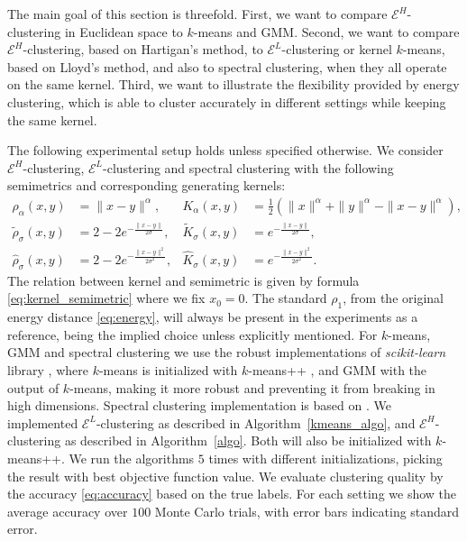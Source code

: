 \documentclass[aps,preprint,nofootinbib,floatfix]{revtex4-1}
\newcommand\kk{K}
\begin{document}
The main goal of this section is threefold. First, we want to compare
$\mathcal{E}^H$-clustering in Euclidean space to 
$k$-means and GMM. Second, we want
to compare $\mathcal{E}^H$-clustering, based on Hartigan's method, to
$\mathcal{E}^L$-clustering or kernel $k$-means, based on Lloyd's method,
and also to 
spectral clustering, when they all operate on the same kernel.
Third, we want to illustrate the flexibility
provided by energy clustering, which is able to cluster accurately in 
different settings while keeping the same kernel.

The following experimental setup holds unless specified
otherwise. 
We consider
$\mathcal{E}^H$-clustering, $\mathcal{E}^L$-clustering 
and spectral clustering with the following semimetrics and corresponding
generating kernels:
\begin{align}
\rho_{\alpha}(x,y) &= \| x-y \|^{\alpha}, 
&\kk_{\alpha}(x,y) &= \tfrac{1}{2} \left( \| x \|^{\alpha} + \| y \|^{\alpha} 
- \| x-y \|^{\alpha} \right), \label{eq:rho_alpha} \\
%
\widetilde{\rho}_{\sigma}(x,y) &= 2 - 2 e^{-\tfrac{\|x-y\|}{2 \sigma}},  
&\widetilde{\kk}_{\sigma}(x,y) &= e^{-\tfrac{\|x-y\|}{2\sigma}}, 
\label{eq:rho_tilde}\\
%
\widehat{\rho}_{\sigma}(x,y) &= 2 - 2 e^{-\tfrac{\|x-y\|^2}{2 \sigma^2}}, 
&\widehat{\kk}_{\sigma}(x,y) &= e^{-\tfrac{\|x-y\|^2}{2\sigma^2}}  .
\label{eq:rho_hat}
\end{align}
The relation between kernel and semimetric is given by 
formula \eqref{eq:kernel_semimetric} where we fix $x_0=0$.
The standard $\rho_1$, from the original energy distance \eqref{eq:energy}, 
will always be present in the experiments 
as a reference, being the implied choice unless explicitly mentioned.
For $k$-means, GMM and spectral clustering we use the robust 
implementations of \emph{scikit-learn} library \citep{scikit-learn}, where  
$k$-means is initialized with 
$k$-means++ \citep{Vassilvitskii}, 
and GMM with the output of $k$-means, making it more robust and preventing
it from breaking in high dimensions. 
Spectral clustering implementation is based on \citep{Malik}. 
We implemented $\mathcal{E}^L$-clustering as described
in Algorithm~\ref{kmeans_algo}, and $\mathcal{E}^H$-clustering
as described in Algorithm~\ref{algo}. Both
will also be initialized with $k$-means++.
We run the algorithms $5$ times with different initializations, picking
the result with best objective function value. 
We evaluate clustering quality by
the accuracy \eqref{eq:accuracy} 
based on the true labels. For each setting we show 
the average accuracy over $100$ Monte
Carlo trials, with error bars indicating standard error.
\end{document}
